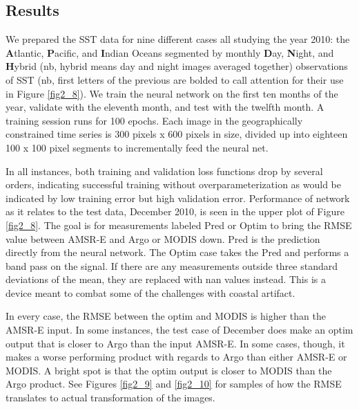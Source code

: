 \begin{refsection}
\subsection{Results}
We prepared the SST data for nine different cases all studying the year 2010: the \textbf{A}tlantic, \textbf{P}acific, and \textbf{I}ndian Oceans segmented by monthly \textbf{D}ay, \textbf{N}ight, and \textbf{H}ybrid (nb, hybrid means day and night images averaged together) observations of SST (nb, first letters of the previous are bolded to call attention for their use in Figure \ref{fig2_8}). We train the neural network on the first ten months of the year, validate with the eleventh month, and test with the twelfth month. A training session runs for 100 epochs. Each image in the geographically constrained time series is 300 pixels x 600 pixels in size, divided up into eighteen 100 x 100 pixel segments to incrementally feed the neural net.

In all instances, both training and validation loss functions drop by several orders, indicating successful training without overparameterization as would be indicated by low training error but high validation error. Performance of network as it relates to the test data, December 2010, is seen in the upper plot of Figure \ref{fig2_8}. The goal is for measurements labeled Pred or Optim to bring the RMSE value between AMSR-E and Argo or MODIS down. Pred is the prediction directly from the neural network. The Optim case takes the Pred and performs a band pass on the signal. If there are any measurements outside three standard deviations of the mean, they are replaced with nan values instead. This is a device meant to combat some of the challenges with coastal artifact.

In every case, the RMSE between the optim and MODIS is higher than the AMSR-E input. In some instances, the test case of December does make an optim output that is closer to Argo than the input AMSR-E. In some cases, though, it makes a worse performing product with regards to Argo than either AMSR-E or MODIS. A bright spot is that the optim output is closer to MODIS than the Argo product. See Figures \ref{fig2_9} and \ref{fig2_10} for samples of how the RMSE translates to actual transformation of the images.  


\end{refsection}
